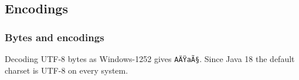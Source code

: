 \documentclass[aspectratio=169,10pt,compress]{beamer}
\begin{document}
\subsection[Encodings]{Encodings}




\begin{frame}[t,fragile] \frametitle{Bytes and encodings}

  \vspace{0.2em}
  \small Decoding UTF-8 bytes as Windows-1252 gives \texttt{AÄŸaÃ§}. Since Java 18 the default charset is UTF-8 on every system.
\end{frame}
\end{document}

